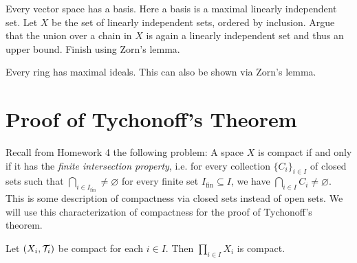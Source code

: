 \begin{example}
  Every vector space has a basis. Here a basis is a
  maximal linearly independent set. Let $X$ be the
  set of linearly independent sets, ordered by
  inclusion. Argue that the union over a chain in
  $X$ is again a linearly independent set and thus
  an upper bound. Finish using Zorn's lemma.
\end{example}

\begin{example}
  Every ring has maximal ideals. This can also be
  shown via Zorn's lemma.
\end{example}

\section{Proof of Tychonoff's Theorem}

\begin{remark}
  Recall from Homework 4 the following problem:
  A space $X$ is compact if and only if it has the
  \emph{finite intersection property}, i.e. for every
  collection $\{C_i\}_{i \in I}$ of closed sets
  such that $\bigcap_{i \in I_\text{fin}} \ne \varnothing$
  for every finite set $I_\text{fin} \subseteq I$,
  we have $\bigcap_{i \in I} C_i \ne \varnothing$. This
  is some description of compactness via closed
  sets instead of open sets.
  We will use this characterization of compactness
  for the proof of Tychonoff's theorem.
\end{remark}

\begin{theorem}[Tychonoff]
  Let $(X_i, \mathcal{T}_i)$ be compact for each $i \in I$.
  Then $\prod_{i \in I} X_i$ is compact.
\end{theorem}

